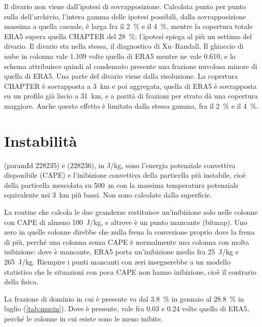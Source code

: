 Il divario non viene dall'ipotesi di sovrapposizione. Calcolata punto per punto sulla
 dell'archivio, l'intera gamma delle ipotesi possibili, dalla sovrapposizione massima
a quella casuale, è larga fra il \SI{2}{\percent} e il \SI{4}{\percent}, mentre la copertura totale
ERA5 supera quella CHAPTER del \SI{28}{\percent}: l'ipotesi spiega al più un settimo del divario.
Il divario sta nella  stessa, il diagnostico di Xu--Randall. Il ghiaccio di nube in
colonna vale \num{1.109} volte quello di ERA5 mentre  ne vale \num{0.610}, e lo schema
attribuisce quindi al condensato presente una frazione nuvolosa minore di quella di ERA5. Una parte
del divario viene dalla risoluzione. La copertura CHAPTER è sovrapposta a \SI{3}{km} e poi
aggregata, quella di ERA5 è sovrapposta su un profilo già liscio a \SI{31}{km}, e a parità di
frazioni per strato dà una copertura maggiore. Anche questo effetto è limitato dalla stessa gamma,
fra il \SI{2}{\percent} e il \SI{4}{\percent}.

\section{Instabilità}
\label{sec:instabilita}

 (paramId 228235) e  (228236), in \si{J/kg}, sono l'energia potenziale
convettiva disponibile (CAPE) e l'inibizione convettiva della particella più instabile, cioè della
particella mescolata su \SI{500}{m} con la massima temperatura potenziale equivalente nei
\SI{3}{km} più bassi. Non sono calcolate dalla superficie.

La routine che calcola le due grandezze restituisce un'inibizione solo nelle colonne con CAPE di
almeno \SI{100}{J/kg}, e altrove  è un punto mancante (bitmap). Uno zero in quelle
colonne direbbe che nulla frena la convezione proprio dove la frena di più, perché una colonna
senza CAPE è normalmente una colonna con molta inibizione: dove  è mancante, ERA5 porta
un'inibizione media fra \SI{25}{J/kg} e \SI{265}{J/kg}. Riempire i punti mancanti con zeri
insegnerebbe a un modello statistico che le situazioni con poca CAPE non hanno inibizione, cioè il
contrario della fisica.

La frazione di dominio in cui  è presente va dal \SI{3.8}{\percent} in gennaio al
\SI{28.8}{\percent} in luglio (\cref{tab:mucin}). Dove è presente,  vale fra \num{0.03}
e \num{0.24} volte quello di ERA5, perché le colonne in cui esiste sono le meno inibite.

